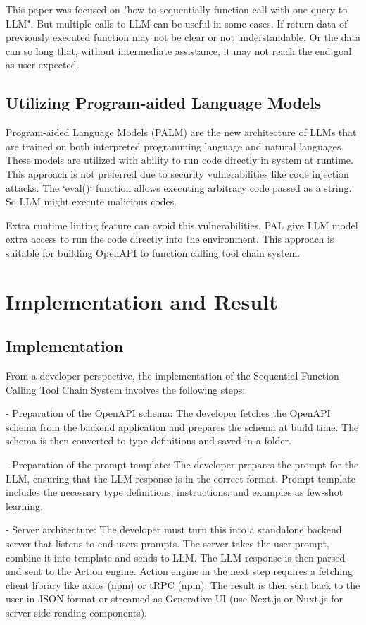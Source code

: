 \documentclass[conference]{IEEEtran}
\begin{document}
This paper was focused on "how to sequentially function call with one query to LLM". But multiple calls to LLM can be useful in some cases. If return data of previously executed function may not be clear or not understandable. Or the data can so long that, without intermediate assistance, it may not reach the end goal as user expected.

\subsection{Utilizing Program-aided Language Models}
Program-aided Language Models (PALM) are the new architecture of LLMs that are trained on both interpreted programming language and natural languages. These models are utilized with ability to run code directly in system at runtime. This approach is not preferred due to security vulnerabilities like code injection attacks. The `eval()` function allows executing arbitrary code passed as a string. So LLM might execute malicious codes.

Extra runtime linting feature can avoid this vulnerabilities. 
PAL give LLM model extra access to run the code directly into the environment. This approach is suitable for building OpenAPI to function calling tool chain system.

\section{Implementation and Result}
\subsection{Implementation}
From a developer perspective, the implementation of the Sequential Function Calling Tool Chain System involves the following steps:

- Preparation of the OpenAPI schema: The developer fetches the OpenAPI schema from the backend application and prepares the schema at build time. The schema is then converted to type definitions and saved in a folder.

- Preparation of the prompt template: The developer prepares the prompt for the LLM, ensuring that the LLM response is in the correct format. Prompt template includes the necessary type definitions, instructions, and examples as few-shot learning.

- Server architecture: The developer must turn this into a standalone backend server that listens to end users prompts. The server takes the user prompt, combine it into template and sends to LLM. The LLM response is then parsed and sent to the Action engine. Action engine in the next step requires a fetching client library like axios (npm) or tRPC (npm). The result is then sent back to the user in JSON format or streamed as Generative UI (use Next.js or Nuxt.js for server side rending components).
\end{document}
